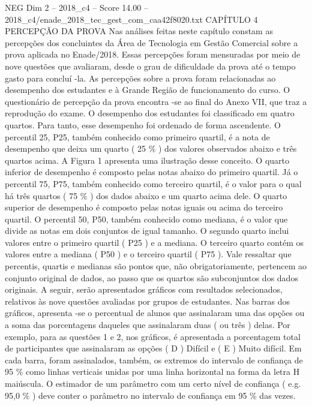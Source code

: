 \begin{textsample}{NEG Dim 2 – 2018\_c4 – Score 14.00 – 2018\_c4/enade\_2018\_tec\_gest\_com\_caa42f8020.txt}  \label{ex:f2_neg_379}
CAPÍTULO 4 PERCEPÇÃO DA PROVA Nas análises feitas neste capítulo constam as percepções dos concluintes da Área de Tecnologia em Gestão Comercial sobre a prova aplicada no Enade/2018.
Essas percepções foram mensuradas por meio de nove questões que avaliaram, desde o grau de dificuldade da prova até o tempo gasto para concluí -la.
As percepções sobre a prova foram relacionadas ao desempenho dos estudantes e à Grande Região de funcionamento do curso.
O questionário de percepção da prova encontra -se ao final do Anexo VII, que traz a reprodução do exame.
O desempenho dos estudantes foi classificado em quatro quartos.
Para tanto, esse desempenho foi ordenado de forma ascendente.
O percentil 25, P25, também conhecido como primeiro quartil, é a nota de desempenho que deixa um quarto ( 25 \% ) dos valores observados abaixo e três quartos acima.
A Figura 1 apresenta uma ilustração desse conceito.
O quarto inferior de desempenho é composto pelas notas abaixo do primeiro quartil.
Já o percentil 75, P75, também conhecido como terceiro quartil, é o valor para o qual há três quartos ( 75 \% ) dos dados abaixo e um quarto acima dele.
O quarto superior de desempenho é composto pelas notas iguais ou acima do terceiro quartil.
O percentil 50, P50, também conhecido como mediana, é o valor que divide as notas em dois conjuntos de igual tamanho.
O segundo quarto inclui valores entre o primeiro quartil ( P25 ) e a mediana.
O terceiro quarto contém os valores entre a mediana ( P50 ) e o terceiro quartil ( P75 ).
Vale ressaltar que percentis, quartis e medianas são pontos que, não obrigatoriamente, pertencem ao conjunto original de dados, ao passo que os quartos são subconjuntos dos dados originais.
A seguir, serão apresentados gráficos com resultados selecionados, relativos às nove questões avaliadas por grupos de estudantes.
Nas barras dos gráficos, apresenta -se o percentual de alunos que assinalaram uma das opções ou a soma das porcentagens daqueles que assinalaram duas ( ou três ) delas.
Por exemplo, para as questões 1 e 2, nos gráficos, é apresentada a porcentagem total de participantes que assinalaram as opções ( D ) Difícil e ( E ) Muito difícil.
Em cada barra, foram assinalados, também, os extremos do intervalo de confiança de 95 \% como linhas verticais unidas por uma linha horizontal na forma da letra H maiúscula.
O estimador de um parâmetro com um certo nível de confiança ( e.g. 95,0 \% ) deve conter o parâmetro no intervalo de confiança em 95 \% das vezes.

\end{textsample}
